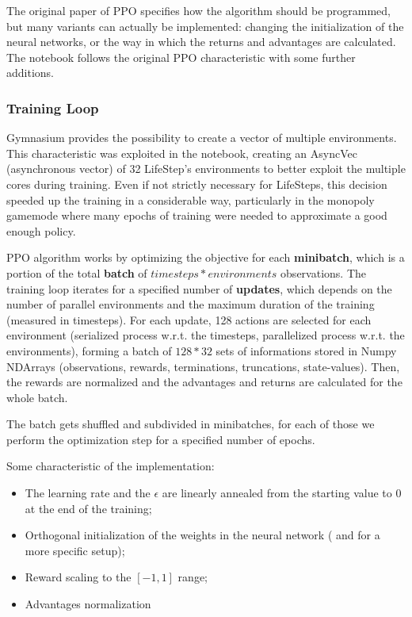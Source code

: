 \documentclass{article}
\begin{document}
The original paper of PPO specifies how the algorithm should be programmed, but many variants can actually be implemented: changing the initialization of the neural networks, or the way in which the returns and advantages are calculated. The notebook follows the original PPO characteristic with some further additions.

\subsubsection{Training Loop}
Gymnasium provides the possibility to create a vector of multiple environments. This characteristic was exploited in the notebook, creating an AsyncVec (asynchronous vector) of 32 LifeStep's environments to better exploit the multiple cores during training. Even if not strictly necessary for LifeSteps, this decision speeded up the training in a considerable way, particularly in the monopoly gamemode where many epochs of training were needed to approximate a good enough policy.

PPO algorithm works by optimizing the objective for each \textbf{minibatch}, which is a portion of the total \textbf{batch} of \(timesteps * environments\) observations. The training loop iterates for a specified number of \textbf{updates}, which depends on the number of parallel environments and the maximum duration of the training (measured in timesteps). For each update, 128 actions are selected for each environment (serialized process w.r.t. the timesteps, parallelized process w.r.t. the environments), forming a batch of \(128 * 32\) sets of informations stored in Numpy NDArrays (observations, rewards, terminations, truncations, state-values). Then, the rewards are normalized and the advantages and returns are calculated for the whole batch.

The batch gets shuffled and subdivided in minibatches, for each of those we perform the optimization step for a specified number of epochs.

Some characteristic of the implementation:
\begin{itemize}
    \item The learning rate and the \(\epsilon\) are linearly annealed from the starting value to 0 at the end of the training;
    \item Orthogonal initialization of the weights in the neural network (\citep{Engstrom2020Implementation} and \citep{andrychowicz2021what} for a more specific setup);
    \item Reward scaling to the \([-1,1]\) range;
    \item Advantages normalization
\end{itemize}
\end{document}
